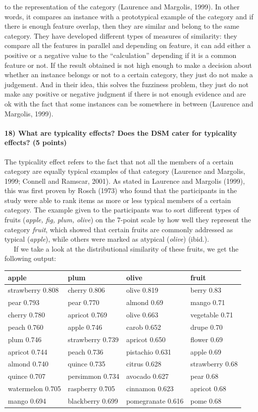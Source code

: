 \documentclass[11pt]{article}
\begin{document}
to the representation of the category (Laurence and Margolis, 1999). In
other words, it compares an instance with a prototypical example of the
category and if there is enough feature overlap, then they are similar
and belong to the same category. They have developed different types of
measures of similarity: they compare all the features in parallel and
depending on feature, it can add either a positive or a negative value
to the ``calculation'' depending if it is a common feature or not. If
the result obtained is not high enough to make a decision about whether
an instance belongs or not to a certain category, they just do not make
a judgement. And in their idea, this solves the fuzziness problem, they
just do not make any positive or negative judgment if there is not
enough evidence and are ok with the fact that some instances can be
somewhere in between (Laurence and Margolis, 1999).

    \hypertarget{what-are-typicality-effects-does-the-dsm-cater-for-typicality-effects-5-points}{%
\paragraph{18) What are typicality effects? Does the DSM cater for
typicality effects? (5
points)}\label{what-are-typicality-effects-does-the-dsm-cater-for-typicality-effects-5-points}}

The typicality effect refers to the fact that not all the members of a
certain category are equally typical examples of that category (Laurence
and Margolis, 1999; Connell and Ramscar, 2001). As stated in Laurence
and Margolis (1999), this was first proven by Rosch (1973) who found
that the participants in the study were able to rank items as more or
less typical members of a certain category. The example given to the
participants was to sort different types of fruits (\emph{apple, fig,
plum, olive}) on the 7-point scale by how well they represent the
category \emph{fruit}, which showed that certain fruits are commonly
addressed as typical (\emph{apple}), while others were marked as
atypical (\emph{olive}) (ibid.).\\
   If we take a look at the distributional similarity of these fruits,
we get the following output:

\begin{longtable}[]{@{}llll@{}}
\toprule
apple & plum & olive & fruit\tabularnewline
\midrule
\endhead
strawberry 0.808 & cherry 0.806 & olive 0.819 & berry
0.83\tabularnewline
pear 0.793 & pear 0.770 & almond 0.69 & mango 0.71\tabularnewline
cherry 0.780 & apricot 0.769 & olive 0.663 & vegetable
0.71\tabularnewline
peach 0.760 & apple 0.746 & carob 0.652 & drupe 0.70\tabularnewline
plum 0.746 & strawberry 0.739 & apricot 0.650 & flower
0.69\tabularnewline
apricot 0.744 & peach 0.736 & pistachio 0.631 & apple
0.69\tabularnewline
almond 0.740 & quince 0.735 & citrus 0.628 & strawberry
0.68\tabularnewline
quince 0.707 & persimmon 0.734 & avocado 0.627 & pear
0.68\tabularnewline
watermelon 0.705 & raspberry 0.705 & cinnamon 0.623 & apricot
0.68\tabularnewline
mango 0.694 & blackberry 0.699 & pomegranate 0.616 & pome
0.68\tabularnewline
\bottomrule
\end{longtable}
\end{document}
